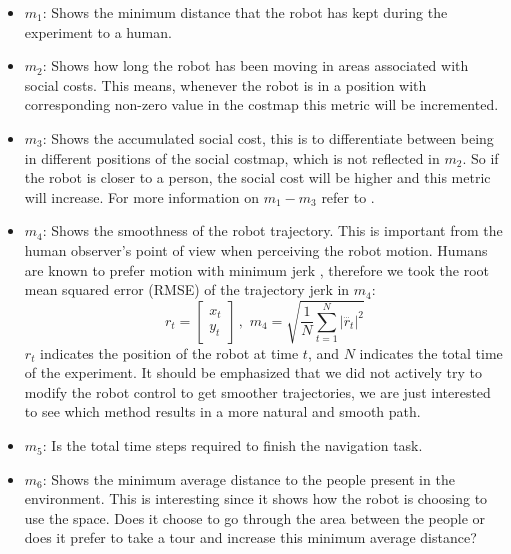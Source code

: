 \begin{itemize}[ noitemsep, leftmargin=*]

\item $m_{1}$: Shows the minimum distance that the robot has kept during the experiment to a human.%


\item $m_{2}$: Shows how long the robot has been moving in areas associated with social costs. This means, whenever the robot is in a position with corresponding non-zero value in the costmap this metric will be incremented.

 \item $m_{3}$: Shows the accumulated social cost, this is to differentiate between being in different positions of the social costmap, which is not reflected in $m_{2}$.
 So if the robot is closer to a person, the social cost will be higher and this metric will increase. For more information on $m_{1}-m_{3}$ refer to \cite{talebpour2015board}. 

\item  $m_{4}$: Shows the smoothness of the robot trajectory. This is important from the human observer's point of view when perceiving the robot motion. Humans are known to prefer motion with minimum jerk \cite{sisbot2010synthesizing}, therefore we took the root mean squared error (RMSE) of the trajectory jerk in $m_{4}$:
\begin{equation}
r_{t} = \begin{bmatrix}
x_{t}\\
y_{t} 

\end{bmatrix} \, , \, \,  m_{4} = \sqrt{\frac{1}{N} \sum_{t=1}^{N}\left | \dddot{r_{t}} \right |^{2}  }
\end{equation}
$r_{t}$ indicates the position of the robot at time $t$, and $N$ indicates the total time of the experiment. It should be emphasized that we did not actively try to modify the robot control to get smoother trajectories, we are just interested to see which method results in a more natural and smooth path.  

\item $m_{5}$: Is the total time steps required to finish the navigation task.


\item $m_{6}$: Shows the minimum average distance to the people present in the environment. This is interesting since it shows how the robot is choosing to use the space. Does it choose to go through the area between the people or does it prefer to take a tour and increase this minimum average distance?

\end{itemize}

